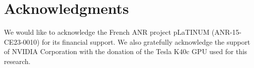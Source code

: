 \section*{Acknowledgments}

We would like to acknowledge the French ANR project pLaTINUM (ANR-15-CE23-0010) for its financial support. We also gratefully acknowledge the support of NVIDIA Corporation with the donation of the Tesla K40c GPU used for this research.
